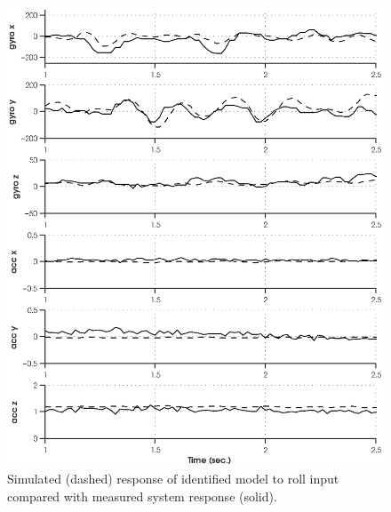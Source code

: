 \newpage
\begin{figure}[htb!]
	\centering
	\includegraphics{../fig/sim_1760_roll.eps}
	\caption{Simulated (dashed) response of identified model to roll input compared with measured system response (solid).}
	\label{sim_1760_roll}
\end{figure}\clearpage

